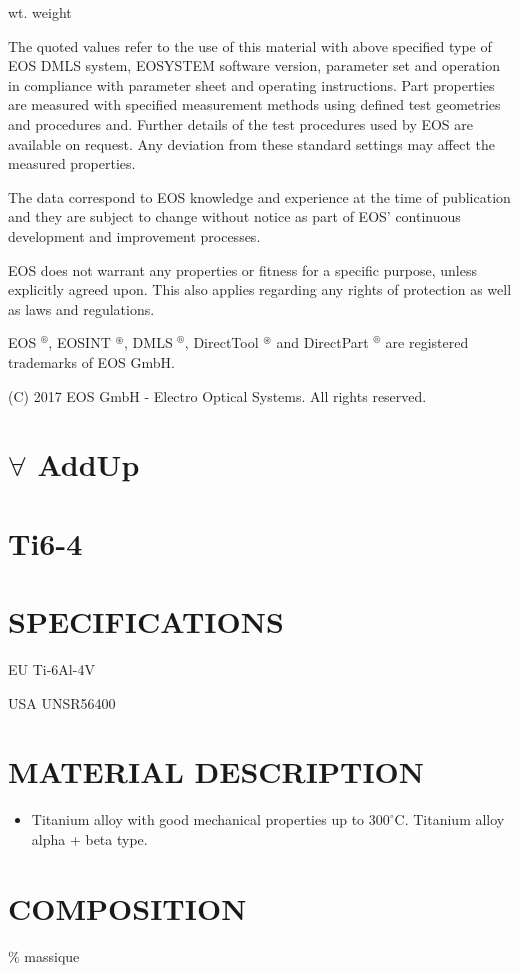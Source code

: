 \documentclass[10pt]{article}
\begin{document}
wt. weight

The quoted values refer to the use of this material with above specified type of EOS DMLS system, EOSYSTEM software version, parameter set and operation in compliance with parameter sheet and operating instructions. Part properties are measured with specified measurement methods using defined test geometries and procedures and. Further details of the test procedures used by EOS are available on request. Any deviation from these standard settings may affect the measured properties.

The data correspond to EOS knowledge and experience at the time of publication and they are subject to change without notice as part of EOS' continuous development and improvement processes.

EOS does not warrant any properties or fitness for a specific purpose, unless explicitly agreed upon. This also applies regarding any rights of protection as well as laws and regulations.

EOS $^{\circledR}$, EOSINT $^{\circledast}$, DMLS $^{\circledR}$, DirectTool $^{\circledast}$ and DirectPart ${ }^{\circledR}$ are registered trademarks of EOS GmbH.

(C) 2017 EOS GmbH - Electro Optical Systems. All rights reserved.

\section*{$\forall$ AddUp}
\section*{Ti6-4}
\section*{SPECIFICATIONS}
EU Ti-6Al-4V

USA UNSR56400

\section*{MATERIAL DESCRIPTION}
\begin{itemize}
  \item Titanium alloy with good mechanical properties up to $300^{\circ} \mathrm{C}$. Titanium alloy alpha + beta type.
\end{itemize}

\section*{COMPOSITION}
$\%$ massique
\end{document}

